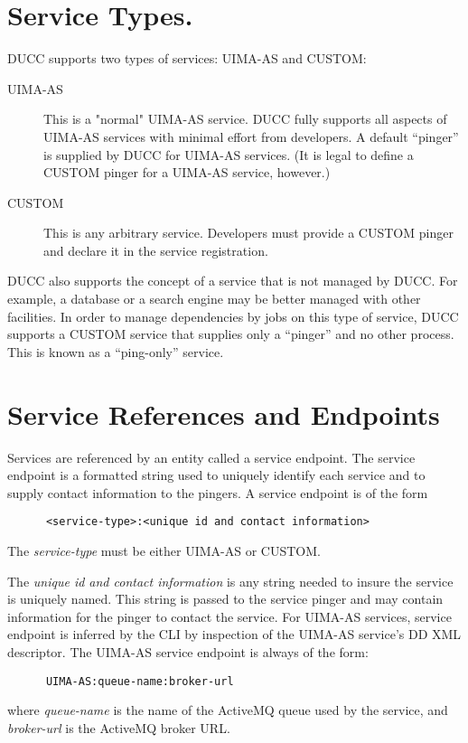     \section{Service Types.}
    \label{sec:services.types}
      DUCC supports two types of services: UIMA-AS and CUSTOM:
      
      \begin{description}
          \item[UIMA-AS] This is a "normal" UIMA-AS service. DUCC fully supports all aspects of UIMA-AS
            services with minimal effort from developers.  A default ``pinger'' is supplied by DUCC
            for UIMA-AS services.  (It is legal to define a CUSTOM pinger for a UIMA-AS service,
            however.)
            
          \item[CUSTOM] This is any arbitrary service.  Developers must provide a CUSTOM pinger
            and declare it in the service registration.            
      \end{description}

      DUCC also supports the concept of a service that is not managed by DUCC.  For example, a
      database or a search engine may be better managed with other facilities.  In order to manage
      dependencies by jobs on this type of service, DUCC supports a CUSTOM service that supplies
      only a ``pinger'' and no other process.  This is known as a ``ping-only'' service.

      \section{Service References and Endpoints} 
      \label{sec:service.endpoints}
      Services are referenced by an entity called a service
      endpoint. The service endpoint is a formatted string used to uniquely identify each
      service and to supply contact information to the pingers.  A service endpoint
      is of the form 
\begin{verbatim}
      <service-type>:<unique id and contact information>
\end{verbatim}
      
      The {\em service-type} must be either UIMA-AS or CUSTOM.
      
      The {\em unique id and contact information} is any string needed to insure the service is
      uniquely named.  This string is passed to the service pinger and may contain 
      information for the pinger to contact the service.  For UIMA-AS services, service endpoint is
      inferred by the CLI by inspection of the UIMA-AS service's DD XML descriptor.  The UIMA-AS
      service endpoint is always of the form:
\begin{verbatim}
      UIMA-AS:queue-name:broker-url
\end{verbatim}
      where {\em queue-name} is the name of the ActiveMQ queue used by the service, and {\em broker-url}
      is the ActiveMQ broker URL.

